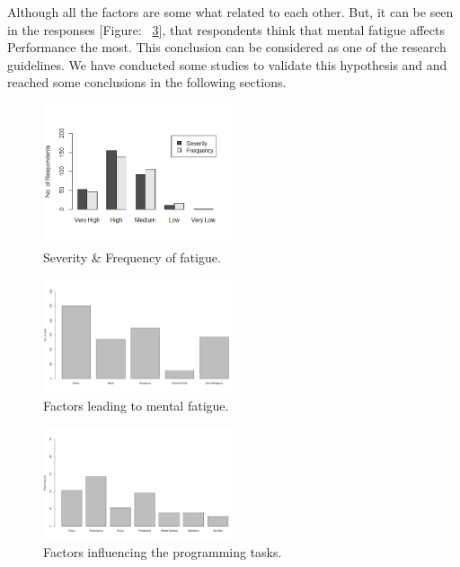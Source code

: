 \documentclass{acm_proc_article-sp}
\begin{document}
Although all the factors are some what related to each other. But, it can be
seen in the responses [Figure: ~\ref{fig:influence}], that respondents think
that mental fatigue affects Performance the most. This conclusion can be considered
as one of the research guidelines. We have conducted some studies to validate
this hypothesis and and reached some conclusions in the following sections.

   \begin{figure}
	\centering
	\includegraphics[width=0.5\textwidth,natwidth=517,natheight=382]{sevFreq.png}
	\caption{Severity \& Frequency of fatigue.}
	\label{fig:sevFreq}
   \end{figure}
   \begin{figure}
	\centering
	\includegraphics[width=0.5\textwidth,natwidth=1241,natheight=744]{factors.png}
	\caption{Factors leading to mental fatigue.}
	\label{fig:factors}
   \end{figure}
   \begin{figure}
	\centering
	\includegraphics[width=0.5\textwidth,natwidth=1242,natheight=749]{influenced.png}
	\caption{Factors influencing the programming tasks.}
	\label{fig:influence}
   \end{figure}
   
\end{document}
